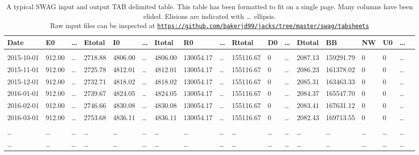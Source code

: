 \begin{sidewaystable}
\centering
\scriptsize
{}
\begin{tabular}{llllllllllllllllll}
\bf{Date} &\bf{E0}  &\ldots &\bf{Etotal}   &\bf{I0}  &\ldots &\bf{Itotal}   &\bf{R0}  &\ldots &\bf{Rtotal}  &\bf{D0} &\ldots &\bf{Dtotal}  &\bf{BB}  &\bf{NW}   &\bf{U0} &\ldots \\ \hline
&&&&&&&&&&&&&&&&\\ 
2015-10-01 &912.00  &\ldots &2718.88  &4806.00  &\ldots &4806.00  &130054.17  &\ldots &155116.67  &0  &\ldots &2087.13 &159291.79  &0 &0  &\ldots \\
2015-11-01 &912.00  &\ldots &2725.78  &4812.01  &\ldots &4812.01  &130054.17  &\ldots &155116.67  &0  &\ldots &2086.23 &161378.02  &0 &0  &\ldots \\
2015-12-01 &912.00  &\ldots &2732.71  &4818.02  &\ldots &4818.02  &130054.17  &\ldots &155116.67  &0  &\ldots &2085.31 &163463.33  &0 &0  &\ldots \\
2016-01-01 &912.00  &\ldots &2739.67  &4824.05  &\ldots &4824.05  &130054.17  &\ldots &155116.67  &0  &\ldots &2084.37 &165547.70  &0 &0  &\ldots \\
2016-02-01 &912.00  &\ldots &2746.66  &4830.08  &\ldots &4830.08  &130054.17  &\ldots &155116.67  &0  &\ldots &2083.41 &167631.12  &0 &0  &\ldots \\
2016-03-01 &912.00  &\ldots &2753.68  &4836.11  &\ldots &4836.11  &130054.17  &\ldots &155116.67  &0  &\ldots &2082.43 &169713.55  &0 &0  &\ldots \\ 
&&&&&&&&&&&&&&&&\\ 
\ldots &\ldots  &\ldots &\ldots  &\ldots &\ldots &\ldots  &\ldots  &\ldots &\ldots  &\ldots  &\ldots &\ldots &\ldots  &\ldots &\ldots  &\ldots \\ 
\ldots &\ldots  &\ldots &\ldots  &\ldots &\ldots &\ldots  &\ldots  &\ldots &\ldots  &\ldots  &\ldots &\ldots &\ldots  &\ldots &\ldots  &\ldots \\ \hline
\end{tabular}
\normalsize
\caption{A typical SWAG input and output TAB delimited table. This table has been formatted to fit on a single page. Many columns 
have been elided. Elisions are indicated with \ldots\ ellipsis.
\vspace{5pt}
\\
Raw input files can be inspected at \href{https://github.com/bakerjd99/jacks/tree/master/swag/tabsheets}{\texttt{https://github.com/bakerjd99/jacks/tree/master/swag/tabsheets}}}
\end{sidewaystable}

